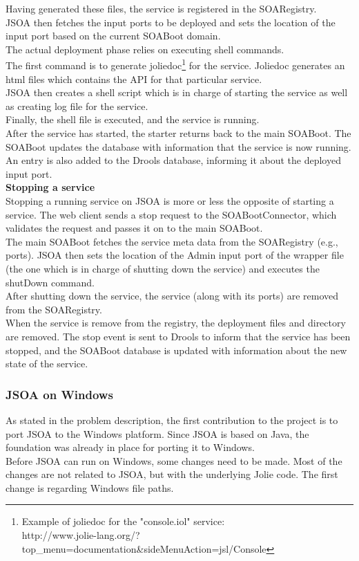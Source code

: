 \documentclass[12pt,a4paper]{article}
\begin{document}
Having generated these files, the service is registered in the SOARegistry.\\
JSOA then fetches the input ports to be deployed and sets the location of the input port based on the current SOABoot domain.\\

The actual deployment phase relies on executing shell\cite{shell_website} commands. \\
The first command is to generate joliedoc\footnote{Example of joliedoc for the "console.iol" service:\\ http://www.jolie-lang.org/?top\_menu=documentation\&sideMenuAction=jsl/Console} for the service. Joliedoc generates an html files which contains the API for that particular service. \\
JSOA then creates a shell script which is in charge of starting the service as well as creating log file for the service. \\
Finally, the shell file is executed, and the service is running.\\

After the service has started, the starter returns back to the main SOABoot. The SOABoot updates the database with information that the service is now running. An entry is also added to the Drools database, informing it about the deployed input port. \\

\textbf{Stopping a service} \\
Stopping a running service on JSOA is more or less the opposite of starting a service.
The web client sends a stop request to the SOABootConnector, which validates the request and passes it on to the main SOABoot. \\
The main SOABoot fetches the service meta data from the SOARegistry (e.g., ports). JSOA then sets the location of the Admin input port of the wrapper file (the one which is in charge of shutting down the service) and executes the shutDown command. \\

After shutting down the service, the service (along with its ports) are removed from the SOARegistry. \\
When the service is remove from the registry, the deployment files and directory are removed.
The stop event is sent to Drools to inform that the service has been stopped, and the SOABoot database is updated with information about the new state of the service.

\subsubsection{JSOA on Windows}\label{subsec:JSOAOnWindows}
As stated in the problem description, the first contribution to the project is to port JSOA to the Windows platform. Since JSOA is based on Java, the foundation was already in place for porting it to Windows.\\
Before JSOA can run on Windows, some changes need to be made. Most of the changes are not related to JSOA, but with the underlying Jolie code. The first change is regarding Windows file paths.  \\
\end{document}
